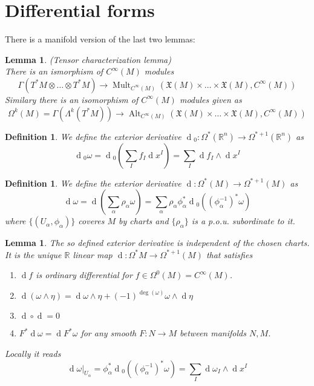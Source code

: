 \documentclass{article}
\numberwithin{theorem}{section}
\newtheorem{lemma}[theorem]{Lemma}
\newtheorem{definition}[theorem]{Definition}
\renewcommand{\d}[1]{\ensuremath{\operatorname{d}\!{#1}}}
\newcommand{\R}{\mathbb{R}}
\newcommand{\1}{\mathds{1}}
\DeclareMathOperator{\Alt}{Alt}
\DeclareMathOperator{\Mult}{Mult}
\begin{document}
\section{Differential forms}
There is a manifold version of the last two lemmas: 

\begin{lemma}(Tensor characterization lemma)\\
    There is an ismorphism of $C^\infty(M)$ modules 
    \[ \Gamma(T^*M \otimes \dots \otimes T^*M) \to \Mult_{C^\infty(M)}(\mathfrak{X}(M) \times \dots \times \mathfrak{X}(M), C^\infty(M)) \]
    Similary there is an isomorphism of $C^\infty(M)$ modules given as 
    \[ \Omega^k(M) = \Gamma(\Lambda^k (T^*M)) \to \Alt_{C^\infty(M)}(\mathfrak{X}(M) \times \dots \times \mathfrak{X}(M), C^\infty(M))\]
\end{lemma}

\begin{definition}
    We define the exterior derivative $\d{_0} : \Omega^*(\R^n) \to \Omega^{*+1}(\R^n) $ as 
    \[ \d{_0} \omega = \d{_0} \left( \sum_{I} f_I \d{x^I} \right)  = \sum_{I} \d{f_I} \wedge \d{x^I}\]
\end{definition}

\begin{definition}
    We define the exterior derivative $\d{ }: \Omega^*(M) \to \Omega^{*+1}(M)$ as 
    \[ \d{\omega} = \d{}  \left( \sum_{\alpha} \rho_\alpha \omega \right) = \sum_{\alpha} \rho_\alpha \phi_\alpha^*\d{_0}((\phi_\alpha^{-1})^* \omega)  \]
    where $\{ (U_\alpha, \phi_\alpha) \} $ coveres $M$ by charts and $\{ \rho_\alpha\}$ is a p.o.u. subordinate to it. 
\end{definition}

\begin{lemma}
    The so defined exterior derivative is independent of the chosen charts. It is the unique $\R$ linear map $\d{ } : \Omega^*{M} \to \Omega^{*+1}(M)$ that satisfies 
    
    \begin{enumerate}
        \item $\d{f}$ is ordinary differential for $f \in \Omega^0(M) = C^\infty(M) $. 
        \item $\d{(\omega \wedge \eta)}  = \d{\omega} \wedge \eta + (-1)^{\deg(\omega)} \omega \wedge \d{\eta} $ 
        \item $\d{} \circ \d{} = 0 $ 
        \item $F^*\d{\omega} = \d{F^*\omega} $ for any smooth $F: N \to M$ between manifolds $N,M$. 
    \end{enumerate}
    Locally it reads 
    \[ \d{\omega}|_{U_\alpha} = \phi_\alpha^*\d{_0}((\phi_\alpha^{-1})^* \omega)  = \sum_I \d{\omega_I} \wedge \d{x^I}  \]
\end{lemma}
\end{document}
